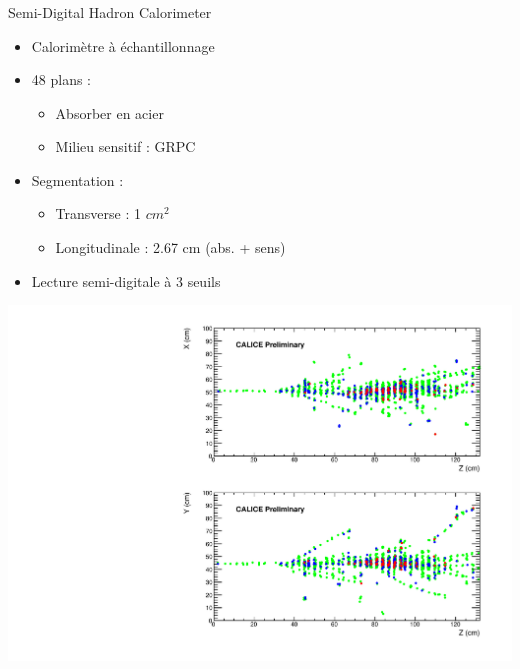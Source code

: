 \documentclass[8pt]{beamer}
\begin{document}
  \begin{frame}
  \frametitle{\secname}
  \framesubtitle{\subsecname}
    \begin{minipage}{0.48\linewidth}
      \begin{block}{Semi-Digital Hadron Calorimeter}
        \begin{itemize}
          \item Calorimètre à échantillonnage
          \item 48 plans :
          \begin{itemize}
            \item Absorber en acier
            \item Milieu sensitif : GRPC
          \end{itemize}
          \item Segmentation :
          \begin{itemize}
            \item Transverse : 1 $cm^2$
            \item Longitudinale : 2.67 cm (abs. + sens)
          \end{itemize}
          \item Lecture semi-digitale à 3 seuils
        \end{itemize}
      \end{block}     
    \end{minipage} \hfill
    \begin{minipage}{0.48\linewidth}
      \includegraphics[width=\linewidth]{sdhcal_pion_80GeV.pdf}
    \end{minipage}
    \begin{minipage}{0.58\linewidth}

\end{minipage}
\end{frame}
\end{document}

